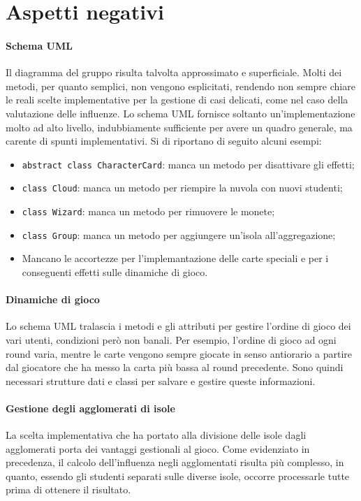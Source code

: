 \documentclass[a4paper]{article}
\begin{document}
	\section{Aspetti negativi}
	
	
	\paragraph{Schema UML} Il diagramma del gruppo risulta talvolta approssimato e superficiale. Molti dei metodi, per quanto semplici, non vengono esplicitati, rendendo non sempre chiare le reali scelte implementative per la gestione di casi delicati, come nel caso della valutazione delle influenze. Lo schema UML fornisce soltanto un'implementazione molto ad alto livello, indubbiamente sufficiente per avere un quadro generale, ma carente di spunti implementativi. Si di riportano di seguito alcuni esempi:
	\begin{itemize}[noitemsep]
		\item \verb|abstract class CharacterCard|: manca un metodo per disattivare gli effetti;
		\item \verb|class Cloud|: manca un metodo per riempire la nuvola con nuovi studenti;
		\item \verb|class Wizard|: manca un metodo per rimuovere le monete;
		\item \verb|class Group|: manca un metodo per aggiungere un’isola all’aggregazione;
		\item  Mancano le accortezze per l'implemantazione delle carte speciali e per i conseguenti effetti sulle dinamiche di gioco.
	\end{itemize}
	
	\paragraph{Dinamiche di gioco} Lo schema UML tralascia i metodi e gli attributi per gestire l'ordine di gioco dei vari utenti, condizioni però non banali. Per esempio, l'ordine di gioco ad ogni round varia, mentre le carte vengono sempre giocate in senso antiorario a partire dal giocatore che ha messo la carta più bassa al round precedente. Sono quindi necessari strutture dati e classi per salvare e gestire queste informazioni.
	
	\paragraph{Gestione degli agglomerati di isole} La scelta implementativa che ha portato alla divisione delle isole dagli agglomerati porta dei vantaggi gestionali al gioco. Come evidenziato in precedenza, il calcolo dell'influenza negli agglomentati risulta più complesso, in quanto, essendo gli studenti separati sulle diverse isole, occorre processarle tutte prima di ottenere il risultato.
	
\end{document}
